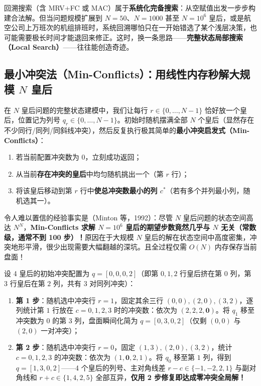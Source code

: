 回溯搜索（含 MRV+FC 或 MAC）属于\textbf{系统化完备搜索}：从空赋值出发一步步构建合法解。但当问题规模扩展到 $N=50$、$N=1000$ 甚至 $N=10^6$ 皇后，或是航空公司上万班次的机组排班时，系统回溯哪怕只在一开始错选了某个浅层决策，也可能需要极长时间才能退回来修正。这时，换一条思路——\textbf{完整状态局部搜索（Local Search）}——往往能创造奇迹。

\subsection{最小冲突法（Min-Conflicts）：用线性内存秒解大规模 $N$ 皇后}

在 $N$ 皇后问题的完整状态建模中，我们让每行 $r \in \{0,\dots,N-1\}$ 恰好放一个皇后，位置记为列号 $q_r \in \{0,\dots,N-1\}$。初始时随机摆满全部 $N$ 个皇后（显然存在不少同行/同列/同斜线冲突），然后反复执行极其简单的\textbf{最小冲突启发式（Min-Conflicts）}：
\begin{enumerate}
  \item 若当前配置冲突数为 $0$，立刻成功返回；
  \item 从当前\textbf{存在冲突的皇后}中均匀随机挑出一个（第 $r$ 行）；
  \item 将该皇后移动到第 $r$ 行中\textbf{使总冲突数最小的列 $c^*$}（若有多个并列最小列，随机选其一）。
\end{enumerate}

令人难以置信的经验事实是（Minton 等，1992）：尽管 $N$ 皇后问题的状态空间高达 $N^N$，\textbf{Min-Conflicts 求解 $N=10^6$ 皇后的期望步数竟然几乎与 $N$ 无关（常数级，通常不到 100 步）！}原因在于大规模 $N$ 皇后的解在状态空间中高度密集，冲突地形平滑，很少出现需要大幅翻越的深坑。且全过程仅需 $O(N)$ 内存保存当前盘面！

\begin{example}
设 4 皇后的初始冲突配置为 $q = [0, 0, 0, 2]$（即第 $0,1,2$ 行皇后挤在第 $0$ 列，第 $3$ 行皇后在第 $2$ 列，共有 $3$ 对同列冲突）：
\begin{enumerate}
  \item \textbf{第 1 步}：随机选中冲突行 $r = 1$，固定其余三行 $(0,0),(2,0),(3,2)$，逐列统计第 $1$ 行放在 $c=0,1,2,3$ 时的冲突数：依次为 $(2, 2, 2, \mathbf{0})$。将 $q_1$ 移至冲突数为 $0$ 的第 $3$ 列，盘面瞬间化简为 $q = [0, 3, 0, 2]$（仅剩 $(0,0)$ 与 $(2,0)$ 一对冲突）；
  \item \textbf{第 2 步}：随机选中冲突行 $r = 0$，固定 $(1,3),(2,0),(3,2)$，统计 $c=0,1,2,3$ 的冲突数：依次为 $(1, \mathbf{0}, 2, 1)$。将 $q_0$ 移至第 $1$ 列，得到 $q = [1, 3, 0, 2]$——4 个皇后的列号、主对角线差 $r-c\in\{-1,-2,2,1\}$ 与副对角线和 $r+c\in\{1,4,2,5\}$ 全部互异，\textbf{仅用 2 步修复即达成零冲突全局解！}
\end{enumerate}
\end{example}


